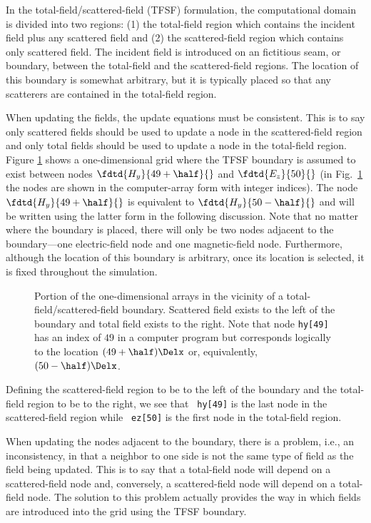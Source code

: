 In the total-field/scattered-field (TFSF) formulation, the
computational domain is divided into two regions: (1) the total-field
region which contains the incident field plus any scattered field and
(2) the scattered-field region which contains only scattered field.
The incident field is introduced on an fictitious seam, or boundary,
between the total-field and the scattered-field regions.  The location
of this boundary is somewhat arbitrary, but it is typically placed so
that any scatterers are contained in the total-field region.

When updating the fields, the update equations must be consistent.
This is to say only scattered fields should be used to update a node
in the scattered-field region and only total fields should be used to
update a node in the total-field region.  Figure \ref{fig:tfsf} shows
a one-dimensional grid where the TFSF boundary is assumed to exist
between nodes $\fdtd{H_y}{49+\half}{}$ and $\fdtd{E_z}{50}{}$ (in
Fig.\ \ref{fig:tfsf} the nodes are shown in the computer-array form
with integer indices).  The node $\fdtd{H_y}{49+\half}{}$ is
equivalent to $\fdtd{H_y}{50-\half}{}$ and will be written using the
latter form in the following discussion.  Note that no matter where
the boundary is placed, there will only be two nodes adjacent to the
boundary---one electric-field node and one magnetic-field node.
Furthermore, although the location of this boundary is arbitrary, once
its location is selected, it is fixed throughout the simulation.
\begin{figure}
  \begin{center}
  \end{center}
  \caption{Portion of the one-dimensional arrays in the vicinity of a
  total-field/scattered-field boundary.  Scattered field 
  exists to the left of the boundary and total field exists
  to the right.  Note that node {\tt hy[49]} has an index of $49$ in a
  computer program but corresponds logically to
  the location $(49+\half)\Delx$ or, equivalently, $(50-\half)\Delx$.
  \label{fig:tfsf} }
\end{figure}
Defining the scattered-field region to be to the left of the boundary
and the total-field region to be to the right, we see that {\tt
hy[49]} is the last node in the scattered-field region while {\tt
ez[50]} is the first node in the total-field region.

When updating the nodes adjacent to the boundary, there is a problem,
i.e., an inconsistency, in that a neighbor to one side is not the same
type of field as the field being updated.  This is to say that a
total-field node will depend on a scattered-field node and,
conversely, a scattered-field node will depend on a total-field node.
The solution to this problem actually provides the way in which fields
are introduced into the grid using the TFSF boundary.

